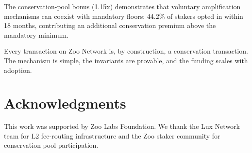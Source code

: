 \documentclass[11pt,letterpaper]{article}
\begin{document}
The conservation-pool bonus (1.15x) demonstrates that voluntary amplification mechanisms can coexist with mandatory floors: 44.2\% of stakers opted in within 18 months, contributing an additional conservation premium above the mandatory minimum.

Every transaction on Zoo Network is, by construction, a conservation transaction. The mechanism is simple, the invariants are provable, and the funding scales with adoption.

\section*{Acknowledgments}

This work was supported by Zoo Labs Foundation. We thank the Lux Network team for L2 fee-routing infrastructure and the Zoo staker community for conservation-pool participation.
\end{document}
